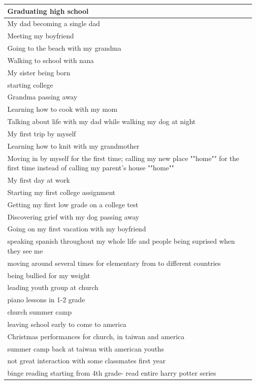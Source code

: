 \documentclass[
  .7em,
  letterpaper,
  DIV=11,
  numbers=noendperiod]{scrartcl}
\begin{document}
\begin{table}
\begin{tabular}{l}
Graduating high school\\
\hline
My dad becoming a single dad\\
\hline
Meeting my boyfriend\\
\hline
Going to the beach with my grandma\\
\hline
Walking to school with nana\\
\hline
My sister being born\\
\hline
starting college\\
\hline
Grandma passing away\\
\hline
Learning how to cook with my mom\\
\hline
Talking about life with my dad while walking my dog at night\\
\hline
My first trip by myself\\
\hline
Learning how to knit with my grandmother\\
\hline
Moving in by myself for the first time; calling my new place ""home"" for the first time instead of calling my parent's house ""home""\\
\hline
My first day at work\\
\hline
Starting my first college assignment\\
\hline
Getting my first low grade on a college test\\
\hline
Discovering grief with my dog passing away\\
\hline
Going on my first vacation with my boyfriend\\
\hline
speaking spanish throughout my whole life and people being suprised when they see me\\
\hline
moving around several times for elementary from to different countries\\
\hline
being bullied for my weight\\
\hline
leading youth group at church\\
\hline
piano lessons in 1-2 grade\\
\hline
church summer camp\\
\hline
leaving school early to come to america\\
\hline
Christmas performances for church, in taiwan and america\\
\hline
summer camp back at taiwan with american youths\\
\hline
not great interaction with some classmates first year\\
\hline
binge reading starting from 4th grade- read entire harry potter series\\

\end{tabular}
\end{table}
\end{document}

